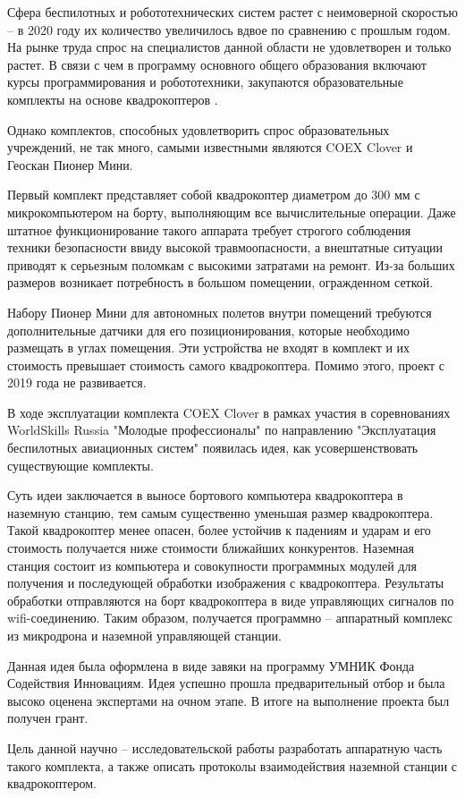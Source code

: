 Сфера беспилотных и робототехнических систем растет с неимоверной скоростью -- в 2020 году их количество увеличилось вдвое по сравнению с прошлым годом. На рынке труда спрос на специалистов данной области не удовлетворен и только растет. В связи с чем в программу основного общего образования включают курсы программирования и робототехники, закупаются образовательные комплекты на основе квадрокоптеров \cite{minobr}.

Однако комплектов, способных удовлетворить спрос образовательных учреждений, не так много, самыми известными являются COEX Clover и Геоскан Пионер Мини.

Первый комплект представляет собой квадрокоптер диаметром до 300 мм с микрокомпьютером на борту, выполняющим все вычислительные операции. Даже штатное функционирование такого аппарата требует строгого соблюдения техники безопасности ввиду высокой травмоопасности, а внештатные ситуации приводят к серьезным поломкам с высокими затратами на ремонт. Из-за больших размеров возникает потребность в большом помещении, огражденном сеткой.

Набору Пионер Мини для автономных полетов внутри помещений требуются дополнительные датчики для его позиционирования, которые необходимо размещать в углах помещения. Эти устройства не входят в комплект и их стоимость превышает стоимость самого квадрокоптера. Помимо этого, проект с 2019 года не развивается.

В ходе эксплуатации комплекта COEX Clover в рамках участия в соревнованиях WorldSkills Russia "Молодые профессионалы" по направлению "Эксплуатация беспилотных авиационных систем" появилась идея, как усовершенствовать существующие комплекты.

Суть идеи заключается в выносе бортового компьютера квадрокоптера в наземную станцию, тем самым существенно уменьшая размер квадрокоптера. Такой квадрокоптер менее опасен, более устойчив к падениям и ударам и его стоимость получается ниже стоимости ближайших конкурентов. Наземная станция состоит из компьютера и совокупности программных модулей для получения и последующей обработки изображения с квадрокоптера. Результаты обработки отправляются на борт квадрокоптера в виде управляющих сигналов по wifi-соединению. Таким образом, получается программно -- аппаратный комплекс из микродрона и наземной управляющей станции.

Данная идея была оформлена в виде завяки на программу УМНИК Фонда Содействия Инновациям. Идея успешно прошла предварительный отбор \cite{umnik} и была высоко оценена экспертами на очном этапе. В итоге на выполнение проекта был получен грант.

Цель данной научно -- исследовательской работы разработать аппаратную часть такого комплекта, а также описать протоколы взаимодействия наземной станции с квадрокоптером.
